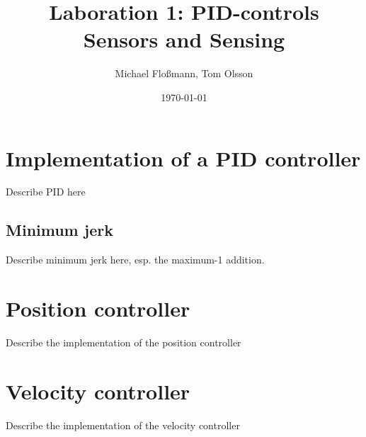 \documentclass[11pt]{article}
\title{Laboration 1: PID-controls\\ {\small Sensors and Sensing}}
\author{Michael Flo{\ss}mann, Tom Olsson}
\date{\today}
\begin{document}
\maketitle %
\listoffigures %
\lstlistoflistings %
\lstset{ matchrangestart=t} %

\section{Implementation of a PID controller}
Describe PID here

\subsection{Minimum jerk}
Describe minimum jerk here, esp. the maximum-1 addition.
\section{Position controller}
Describe the implementation of the position controller
\section{Velocity controller}
Describe the implementation of the velocity controller
\end{document}
